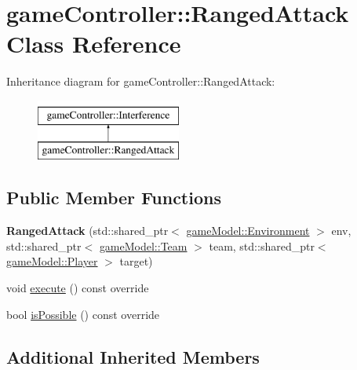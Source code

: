 \hypertarget{classgame_controller_1_1_ranged_attack}{\section{game\-Controller\-:\-:Ranged\-Attack Class Reference}
\label{classgame_controller_1_1_ranged_attack}
}
Inheritance diagram for game\-Controller\-:\-:Ranged\-Attack\-:\begin{figure}[H]
\begin{center}
\leavevmode
\includegraphics[height=2.000000cm]{classgame_controller_1_1_ranged_attack}
\end{center}
\end{figure}
\subsection*{Public Member Functions}
\begin{DoxyCompactItemize}
\item 
\hypertarget{classgame_controller_1_1_ranged_attack_a467d9e5a0c8e6c19b3f3214bc3781c19}{{\bfseries Ranged\-Attack} (std\-::shared\-\_\-ptr$<$ \hyperlink{classgame_model_1_1_environment}{game\-Model\-::\-Environment} $>$ env, std\-::shared\-\_\-ptr$<$ \hyperlink{classgame_model_1_1_team}{game\-Model\-::\-Team} $>$ team, std\-::shared\-\_\-ptr$<$ \hyperlink{classgame_model_1_1_player}{game\-Model\-::\-Player} $>$ target)}\label{classgame_controller_1_1_ranged_attack_a467d9e5a0c8e6c19b3f3214bc3781c19}

\item 
void \hyperlink{classgame_controller_1_1_ranged_attack_a581a62b0f86ef2d510c17cd896382b46}{execute} () const override
\item 
bool \hyperlink{classgame_controller_1_1_ranged_attack_a95776ac1efedefee37dd42acd5308e6b}{is\-Possible} () const override
\end{DoxyCompactItemize}
\subsection*{Additional Inherited Members}


